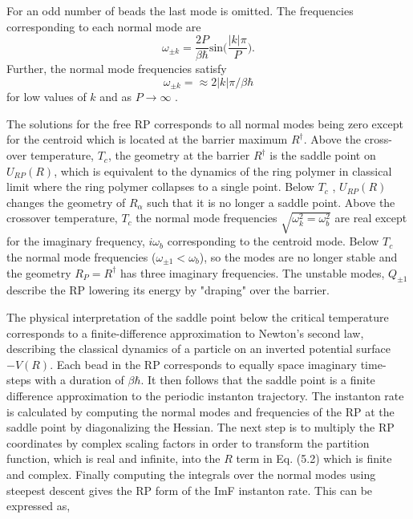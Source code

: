 \documentclass[phd,tocprelim]{cornell}
\begin{document}
For an odd number of beads the last mode is omitted. The frequencies corresponding to each normal mode are 
\begin{equation}
\omega_{\pm k} = \frac{2P}{\beta \hbar} \textrm{sin}\bigg( \frac{|k|\pi}{P} \bigg).
\end{equation}
Further, the normal mode frequencies satisfy 
\begin{equation}
\omega_{\pm k} = \approx 2|k|\pi/\beta \hbar
\end{equation}
 for low values of $k$ and as $P\to \infty$ . 
 
The solutions for the free RP corresponds to all normal modes being zero except for the centroid which is located at the barrier maximum $R^{\dagger}$.
 Above the cross-over temperature, $T_c$, the geometry at the barrier $R^{\dagger}$ is the saddle point on $U_{RP}(R)$, which is equivalent to the dynamics of the ring polymer in classical limit where the ring polymer collapses to a single point. Below $T_c$ , $U_{RP}(R)$ changes the geometry of $R_{\alpha}$ such that it is no longer a saddle point. Above the crossover temperature, $T_c$ the normal mode frequencies $\sqrt{\omega_k^2=\omega_b^2}$ are real except for the imaginary frequency, $i\omega_b$ corresponding to the centroid mode. Below $T_c$ the normal mode frequencies ($\omega_{\pm1}<\omega_b$), so the modes are no longer stable and the geometry $R_P= R^{\dagger}$ has three imaginary frequencies. The unstable modes, $Q_{\pm 1}$ describe the RP lowering its energy by "draping" over the barrier. 
 
 The physical interpretation of the saddle point below the critical temperature corresponds to a finite-difference approximation to Newton's second law, describing the classical dynamics of a particle on an inverted potential surface $-V(R)$. Each bead in the RP corresponds to equally space imaginary time-steps with a duration of $\beta \hbar$. It then follows that the saddle point is a finite difference approximation to the periodic instanton trajectory. The instanton rate is calculated by computing the normal modes and frequencies of the RP at the saddle point by diagonalizing the Hessian. The next step is to multiply the RP coordinates by complex scaling factors in order to transform the partition function, which is real and infinite, into the $R$ term in Eq. (5.2) which is finite and complex. Finally computing the integrals over the normal modes using steepest descent gives the RP form of the ImF instanton rate. This can be expressed as, 
 
\end{document}
